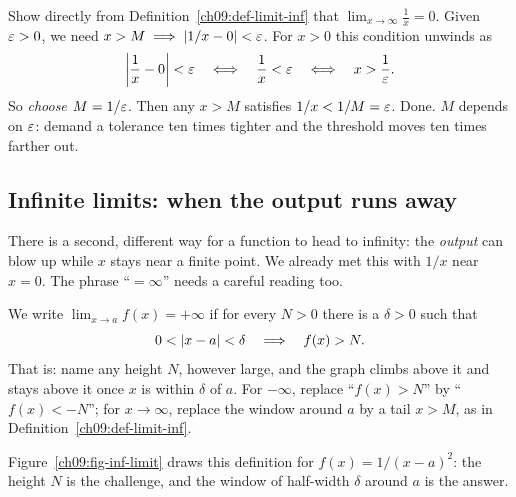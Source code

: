 \begin{labbox}
Show directly from Definition~\ref{ch09:def-limit-inf} that
$\lim_{x\to\infty} \tfrac{1}{x} = 0$. Given $\varepsilon>0$, we need
$x>M \implies \lvert1/x - 0\rvert < \varepsilon$. For $x>0$ this condition unwinds as
\[
  \left\lvert \frac1x - 0 \right\rvert < \varepsilon
  \quad\Longleftrightarrow\quad \frac1x < \varepsilon
  \quad\Longleftrightarrow\quad x > \frac1{\varepsilon} .
\]
So \emph{choose $M = 1/\varepsilon$.} Then any $x>M$ satisfies $1/x < 1/M = \varepsilon$. Done.
$M$ depends on $\varepsilon$: demand a tolerance ten times tighter and the
threshold moves ten times farther out.
\end{labbox}

\subsection{Infinite limits: when the output runs away}

There is a second, different way for a function to head to infinity: the
\emph{output} can blow up while $x$ stays near a finite point. We already met
this with $1/x$ near $x=0$. The phrase ``$=\infty$'' needs a careful reading
too.

\begin{definition}
\label{ch09:def-inf-limit}
We write $\displaystyle\lim_{x\to a} f(x) = +\infty$ if for every $N>0$ there is
a $\delta>0$ such that
\[
  0 < \lvert x-a\rvert < \delta \quad\Longrightarrow\quad f(x) > N .
\]
That is: name any height $N$, however large, and the graph climbs above it and
stays above it once $x$ is within $\delta$ of $a$. For $-\infty$, replace
``$f(x)>N$'' by ``$f(x)<-N$''; for $x\to\infty$, replace the window around $a$
by a tail $x>M$, as in Definition~\ref{ch09:def-limit-inf}.
\end{definition}

Figure~\ref{ch09:fig-inf-limit} draws this definition for $f(x)=1/(x-a)^2$: the
height $N$ is the challenge, and the window of half-width $\delta$ around $a$ is
the answer.

